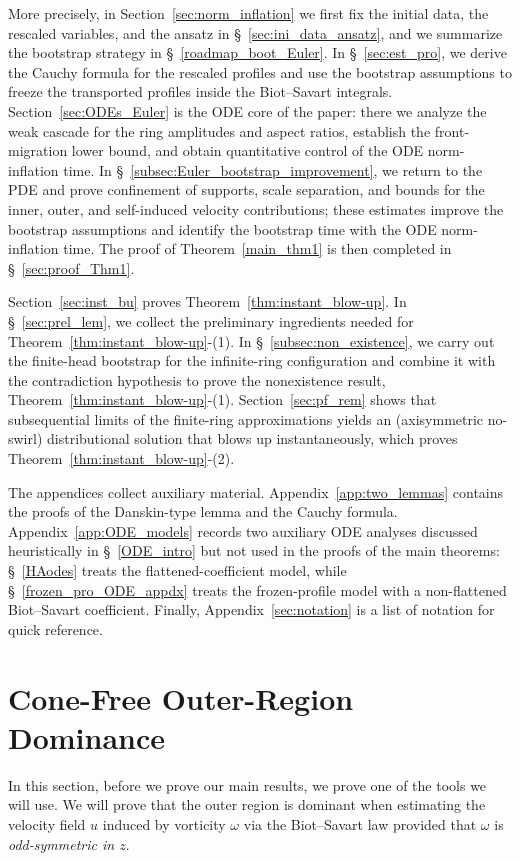 \documentclass[reqno,11pt]{amsart}
\begin{document}
More precisely, in Section~\ref{sec:norm_inflation} we first fix the initial data, the rescaled variables, and the ansatz in \S~\ref{sec:ini_data_ansatz}, and we summarize the bootstrap strategy in \S~\ref{roadmap_boot_Euler}. In \S~\ref{sec:est_pro}, we derive the Cauchy formula for the rescaled profiles and use the bootstrap assumptions to freeze the transported profiles inside the Biot--Savart integrals. Section~\ref{sec:ODEs_Euler} is the ODE core of the paper: there we analyze the weak cascade for the ring amplitudes and aspect ratios, establish the front-migration lower bound, and obtain quantitative control of the ODE norm-inflation time. In \S~\ref{subsec:Euler_bootstrap_improvement}, we return to the PDE and prove confinement of supports, scale separation, and bounds for the inner, outer, and self-induced velocity contributions; these estimates improve the bootstrap assumptions and identify the bootstrap time with the ODE norm-inflation time. The proof of Theorem~\ref{main_thm1} is then completed in \S~\ref{sec:proof_Thm1}.

Section~\ref{sec:inst_bu} proves Theorem~\ref{thm:instant_blow-up}. In \S~\ref{sec:prel_lem}, we collect the preliminary ingredients needed for Theorem~\ref{thm:instant_blow-up}-(1). In \S~\ref{subsec:non_existence}, we carry out the finite-head bootstrap for the infinite-ring configuration and combine it with the contradiction hypothesis to prove the nonexistence result, Theorem~\ref{thm:instant_blow-up}-(1).  Section~\ref{sec:pf_rem}  shows that subsequential limits of the finite-ring approximations yields an (axisymmetric no-swirl) distributional solution that blows up instantaneously, which proves Theorem~\ref{thm:instant_blow-up}-(2).

The appendices collect auxiliary material. Appendix~\ref{app:two_lemmas} contains the proofs of the Danskin-type lemma and the Cauchy formula. Appendix~\ref{app:ODE_models} records two auxiliary ODE analyses discussed heuristically in \S~\ref{ODE_intro} but not used in the proofs of the main theorems: \S~\ref{HAodes} treats the flattened-coefficient model, while \S~\ref{frozen_pro_ODE_appdx} treats the frozen-profile model with a non-flattened Biot--Savart coefficient. Finally, Appendix~\ref{sec:notation} is a list of notation for quick reference.

\section{Cone-Free Outer-Region Dominance}
\label{sec:cone_free_key_lem}
In this section, before we prove our main results, we prove one of the tools we will use. We will prove that the outer region is dominant when estimating the velocity field $u$ induced by vorticity $\omega$ via the Biot--Savart law provided that $\omega$ is \emph{odd-symmetric in $z$}. 
\end{document}
